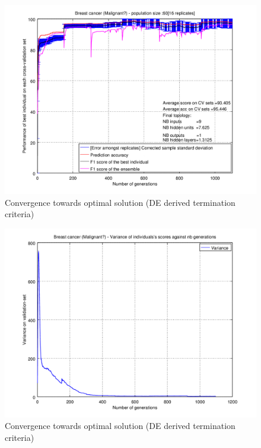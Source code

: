 \documentclass[a4paper,12pt, oneside]{memoir}
\begin{document}
\begin{figure}[h]
  \centering
  \includegraphics[scale=0.7]{malignant-performancesVSepochs-DE-derived-rand}
  \vspace{-12pt}
  \caption{Convergence towards optimal solution (DE derived termination criteria)}
  \label{malignant-perfs-DE-derived-rand}
\end{figure}

\begin{figure}[h]
  \centering
  \includegraphics[scale=0.7]{malignant-varianceVSepochs-DE-derived-rand}
  \vspace{-12pt}
  \caption{Convergence towards optimal solution (DE derived termination criteria)}
  \label{malignant-variance-DE-derived-rand}
\end{figure}
\end{document}
